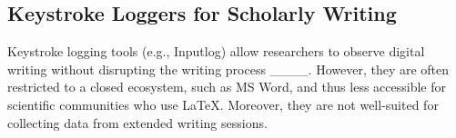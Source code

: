



\subsection{Keystroke Loggers for Scholarly Writing}

Keystroke logging tools (e.g., Inputlog) allow researchers to observe digital writing without disrupting the writing process ____. However, they are often restricted to a closed ecosystem, such as MS Word, and thus less accessible for scientific communities who use \LaTeX. Moreover, they are not well-suited for collecting data from extended writing sessions.

